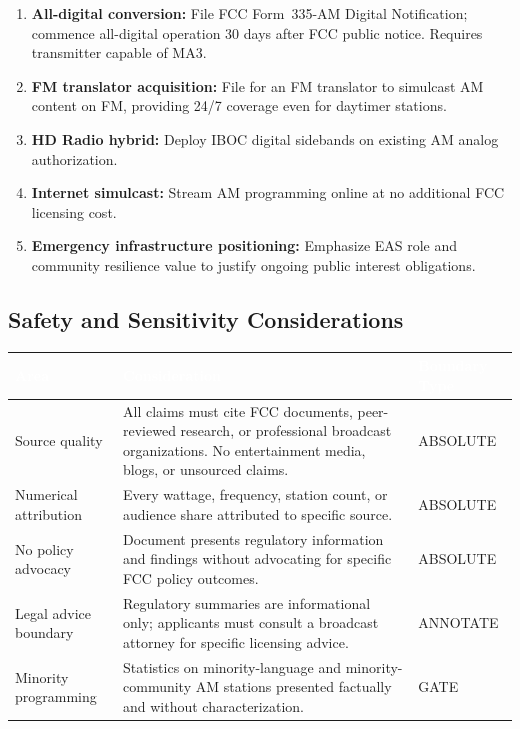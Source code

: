 \documentclass[11pt,letterpaper]{article}
\newcommand{\tableheader}[1]{\textbf{\sffamily\textcolor{white}{#1}}}
\begin{document}
\begin{asciibox}
\begin{enumerate}[leftmargin=*, label=\textbf{\arabic*.}]
  \item \textbf{All-digital conversion:} File FCC Form~335-AM Digital Notification; commence
        all-digital operation 30 days after FCC public notice. Requires transmitter capable of MA3.
  \item \textbf{FM translator acquisition:} File for an FM translator to simulcast AM content on FM,
        providing 24/7 coverage even for daytimer stations.
  \item \textbf{HD Radio hybrid:} Deploy IBOC digital sidebands on existing AM analog authorization.
  \item \textbf{Internet simulcast:} Stream AM programming online at no additional FCC licensing cost.
  \item \textbf{Emergency infrastructure positioning:} Emphasize EAS role and community resilience
        value to justify ongoing public interest obligations.
\end{enumerate}

\subsection{Safety and Sensitivity Considerations}

\begin{center}
\begin{tabularx}{\textwidth}{L{3.5cm}XC{2.5cm}}
\toprule
{}
\tableheader{Area} & \tableheader{Consideration} & \tableheader{Boundary Type} \\
\midrule
Source quality & All claims must cite FCC documents, peer-reviewed research, or professional broadcast organizations. No entertainment media, blogs, or unsourced claims. & ABSOLUTE \\
Numerical attribution & Every wattage, frequency, station count, or audience share attributed to specific source. & ABSOLUTE \\
No policy advocacy & Document presents regulatory information and findings without advocating for specific FCC policy outcomes. & ABSOLUTE \\
Legal advice boundary & Regulatory summaries are informational only; applicants must consult a broadcast attorney for specific licensing advice. & ANNOTATE \\
Minority programming & Statistics on minority-language and minority-community AM stations presented factually and without characterization. & GATE \\
\bottomrule
\end{tabularx}
\end{center}


\end{asciibox}
\end{document}
